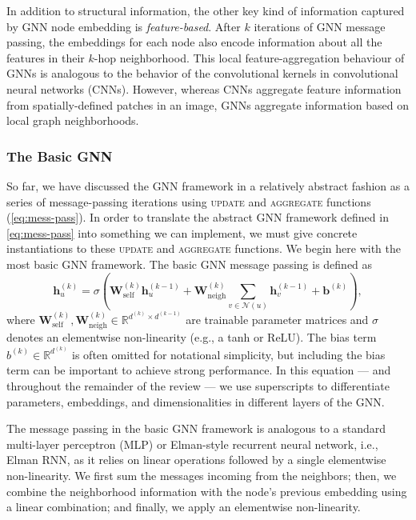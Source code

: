 \documentclass[10pt]{book}
\let\defaultmarginpar\marginpar
\renewcommand\marginpar[2][]{\defaultmarginpar{\itshape\color{gray}#2}}
\begin{document}
In addition to structural information, the other key kind of information captured by GNN node embedding is \emph{feature-based}\marginpar{feature-based}. After $k$ iterations of GNN message passing, the embeddings for each node also encode information about all the features in their $k$-hop neighborhood. This local feature-aggregation behaviour of GNNs is analogous to the behavior of the convolutional kernels in convolutional neural networks (CNNs). However, whereas CNNs aggregate
feature information from spatially-defined patches in an image, GNNs aggregate information based on local graph neighborhoods.

\subsubsection{The Basic GNN}

So far, we have discussed the GNN framework in a relatively abstract fashion as a series of message-passing iterations using \textsc{update} and \textsc{aggregate} functions (\autoref{eq:mess-pass}). In order to translate the abstract GNN framework defined in \autoref{eq:mess-pass} into something we can implement, we must give concrete instantiations to these \textsc{update} and \textsc{aggregate} functions. We begin here with the most basic GNN framework. The basic GNN message passing is defined as
\begin{equation}
    \mathbf h^{(k)}_u = \sigma \left( \mathbf W^{(k)}_\text{self} \mathbf h_u^{(k-1)} + \mathbf W_\text{neigh}^{(k)} \sum_{v \in \mathcal N(u)} \mathbf h^{(k-1)}_v + \mathbf b^{(k)} \right),
\end{equation}
where $\mathbf W^{(k)}_\text{self}, \mathbf W_\text{neigh}^{(k)} \in \mathbb R^{d^{(k)} \times d^{(k-1)}}$ are trainable parameter matrices and $\sigma$ denotes an elementwise non-linearity (e.g., a tanh or ReLU). The bias term $b^{(k)} \in \mathbb R^{d^{(k)}}$ is often omitted for notational simplicity, but including the bias term can be important to achieve strong performance. In this equation --- and throughout the remainder of the review --- we use superscripts to differentiate parameters, embeddings, and dimensionalities in different layers of the GNN.

The message passing in the basic GNN framework is analogous to a standard multi-layer perceptron (MLP) or Elman-style recurrent neural network, i.e., Elman RNN, as it relies on linear operations followed by a single elementwise non-linearity. We first sum the messages incoming from the neighbors; then, we combine the neighborhood information with the node's previous embedding using a linear combination; and finally, we apply an elementwise non-linearity.
\end{document}
